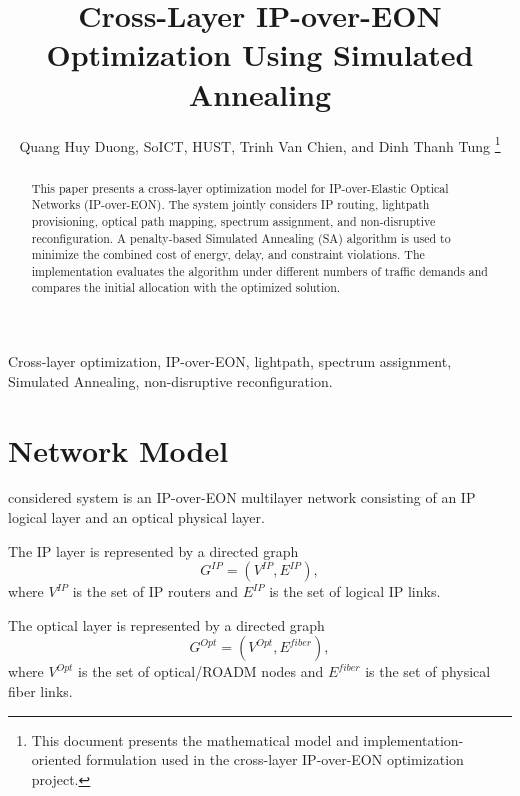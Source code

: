 \documentclass[journal,10pt]{IEEEtran}
\begin{document}
\title{Cross-Layer IP-over-EON Optimization Using Simulated Annealing}

\author{Quang Huy Duong, SoICT, HUST, Trinh Van Chien, and Dinh Thanh Tung%
\thanks{This document presents the mathematical model and implementation-oriented formulation used in the cross-layer IP-over-EON optimization project.}}


\maketitle

\begin{abstract}
This paper presents a cross-layer optimization model for IP-over-Elastic Optical Networks (IP-over-EON). The system jointly considers IP routing, lightpath provisioning, optical path mapping, spectrum assignment, and non-disruptive reconfiguration. A penalty-based Simulated Annealing (SA) algorithm is used to minimize the combined cost of energy, delay, and constraint violations. The implementation evaluates the algorithm under different numbers of traffic demands and compares the initial allocation with the optimized solution.
\end{abstract}

\begin{IEEEkeywords}
Cross-layer optimization, IP-over-EON, lightpath, spectrum assignment, Simulated Annealing, non-disruptive reconfiguration.
\end{IEEEkeywords}

\section{Network Model}
 considered system is an IP-over-EON multilayer network consisting of an IP logical layer and an optical physical layer.

The IP layer is represented by a directed graph
\begin{equation}
    G^{IP} = \left(V^{IP}, E^{IP}\right),
\end{equation}
where $V^{IP}$ is the set of IP routers and $E^{IP}$ is the set of logical IP links.

The optical layer is represented by a directed graph
\begin{equation}
    G^{Opt} = \left(V^{Opt}, E^{fiber}\right),
\end{equation}
where $V^{Opt}$ is the set of optical/ROADM nodes and $E^{fiber}$ is the set of physical fiber links.
\end{document}
